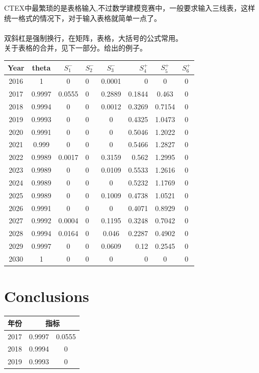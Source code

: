 \documentclass{mcmthesis}
\begin{document}
\begin{enumerate}
CTEX中最繁琐的是表格输入,不过数学建模竞赛中，一般要求输入三线表，这样统一格式的情况下，对于输入表格就简单一点了。\\
\\
双斜杠是强制换行，在矩阵，表格，大括号的公式常用。\\
关于表格的合并，见下一部分。给出的例子。
\begin{center}
\begin{tabular}{c|cclcrcc}
\hline
Year & theta & $S_1^-$ & $S_2^-$ & $S_3^-$ & $S_4^+$ & $S_5^+$ & $S_6^+$ \\%
\hline
2016 & 1      & 0      & 0 & 0.0001 & 0      & 0      & 0 \\
2017 & 0.9997 & 0.0555 & 0 & 0.2889 & 0.1844 & 0.463  & 0 \\
2018 & 0.9994 & 0      & 0 & 0.0012 & 0.3269 & 0.7154 & 0 \\
2019 & 0.9993 & 0      & 0 & 0      & 0.4325 & 1.0473 & 0 \\
2020 & 0.9991 & 0      & 0 & 0      & 0.5046 & 1.2022 & 0 \\
2021 & 0.999  & 0      & 0 & 0      & 0.5466 & 1.2827 & 0 \\
2022 & 0.9989 & 0.0017 & 0 & 0.3159 & 0.562  & 1.2995 & 0 \\
2023 & 0.9989 & 0      & 0 & 0.0109 & 0.5533 & 1.2616 & 0 \\
2024 & 0.9989 & 0      & 0 & 0      & 0.5232 & 1.1769 & 0 \\
2025 & 0.9989 & 0      & 0 & 0.1009 & 0.4738 & 1.0521 & 0 \\
2026 & 0.9991 & 0      & 0 & 0      & 0.4071 & 0.8929 & 0 \\
2027 & 0.9992 & 0.0004 & 0 & 0.1195 & 0.3248 & 0.7042 & 0 \\
2028 & 0.9994 & 0.0164 & 0 & 0.046  & 0.2287 & 0.4902 & 0 \\
2029 & 0.9997 & 0      & 0 & 0.0609 & 0.12   & 0.2545 & 0 \\
2030 & 1      & 0      & 0 & 0      & 0      & 0      & 0 \\
\hline
\end{tabular}
\end{center}

\section{Conclusions}


\begin{center}
\begin{tabular}{c|cc}
\hline
年份 & \multicolumn{2}{c}{指标}\\
\hline
2017 & 0.9997 & 0.0555 \\
2018 & 0.9994 & 0      \\
2019 & 0.9993 & 0      \\
\hline
\end{tabular}
\end{center}



\end{enumerate}
\end{document}
